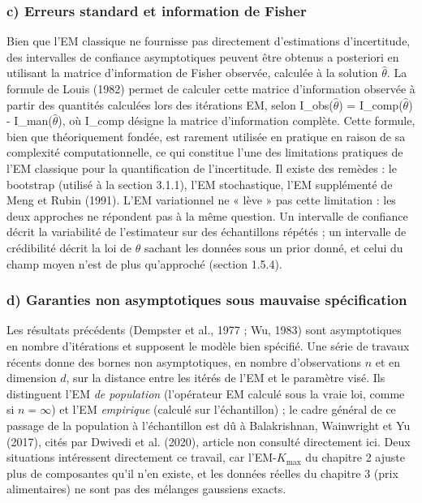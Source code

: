 \subsubsection{c) Erreurs standard et information de Fisher}
Bien que l'EM classique ne fournisse pas directement d'estimations d'incertitude, des intervalles de confiance asymptotiques peuvent être obtenus a posteriori en utilisant la matrice d'information de Fisher observée, calculée à la solution $\hat{\theta }$. La formule de Louis (1982) permet de calculer cette matrice d'information observée à partir des quantités calculées lors des itérations EM, selon I\_obs($\hat{\theta }$) = I\_comp($\hat{\theta }$) - I\_man($\hat{\theta }$), où I\_comp désigne la matrice d'information complète. Cette formule, bien que théoriquement fondée, est rarement utilisée en pratique en raison de sa complexité computationnelle, ce qui constitue l'une des limitations pratiques de l'EM classique pour la quantification de l'incertitude. Il existe des remèdes : le bootstrap (utilisé à la section 3.1.1), l'EM stochastique, l'EM supplémenté de Meng et Rubin (1991). L'EM variationnel ne « lève » pas cette limitation : les deux approches ne répondent pas à la même question. Un intervalle de confiance décrit la variabilité de l'estimateur sur des échantillons répétés ; un intervalle de crédibilité décrit la loi de $\theta$ sachant les données sous un prior donné, et celui du champ moyen n'est de plus qu'approché (section 1.5.4).

\subsubsection{d) Garanties non asymptotiques sous mauvaise spécification}
Les résultats précédents (Dempster et al., 1977 ; Wu, 1983) sont asymptotiques en nombre d'itérations et supposent le modèle bien spécifié. Une série de travaux récents donne des bornes non asymptotiques, en nombre d'observations $n$ et en dimension $d$, sur la distance entre les itérés de l'EM et le paramètre visé. Ils distinguent l'EM \emph{de population} (l'opérateur EM calculé sous la vraie loi, comme si $n = \infty$) et l'EM \emph{empirique} (calculé sur l'échantillon) ; le cadre général de ce passage de la population à l'échantillon est dû à Balakrishnan, Wainwright et Yu (2017), cités par Dwivedi et al. (2020), article non consulté directement ici. Deux situations intéressent directement ce travail, car l'EM-$K_{\max}$ du chapitre 2 ajuste plus de composantes qu'il n'en existe, et les données réelles du chapitre 3 (prix alimentaires) ne sont pas des mélanges gaussiens exacts.

